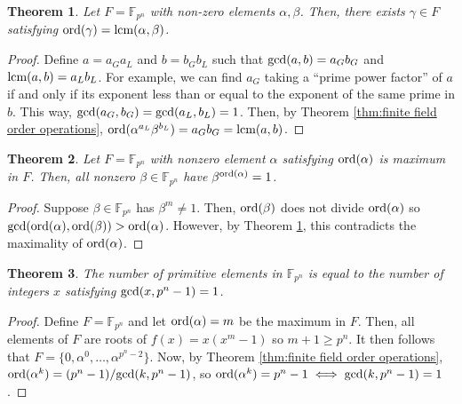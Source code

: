 \documentclass[
    parskip=half,
    toc=flat,
    toc=sectionentrydotfill,
]{scrartcl}  %
\theoremstyle{definition}
\theoremstyle{plain}
\newtheorem{theorem}{Theorem}[definition]
\theoremstyle{remark}
\newcommand{\F}{\mathbb{F}_{p^n}}
\renewcommand{\gcd}[1]{\textup{gcd}(#1)}
\newcommand{\lcm}[1]{\textup{lcm}(#1)}
\newcommand{\ord}[1]{\textup{ord}(#1)}
\begin{document}
\begin{theorem}
    \label{thm:exists element for every order lcm}
    Let $F=\F$ with non-zero elements $\alpha,\beta$.
    Then, there exists $\gamma\in F$ satisfying $\ord\gamma=\lcm{\alpha,\beta}$.
\end{theorem}

\begin{proof}
    Define $a=a_Ga_L$ and $b=b_Gb_L$ such that $\gcd{a,b}=a_Gb_G$ and $\lcm{a,b}=a_Lb_L$.
    For example, we can find $a_G$ taking a ``prime power factor'' of $a$ if and only if its exponent less than or
    equal to the exponent of the same prime in $b$.
    This way, $\gcd{a_G,b_G}=\gcd{a_L,b_L}=1$.
    Then, by Theorem \ref{thm:finite field order operations}, $\ord{\alpha^{a_L}\beta^{b_L}}=a_Gb_G=\lcm{a,b}$.
\end{proof}

\begin{theorem}
    Let $F=\F$ with nonzero element $\alpha$ satisfying $\ord{\alpha}$ is maximum in $F$.
    Then, all nonzero $\beta\in\F$ have $\beta^{\ord\alpha}=1$.
\end{theorem}

\begin{proof}
    Suppose $\beta\in\F$ has $\beta^m\neq 1$.
    Then, $\ord\beta$ does not divide $\ord\alpha$ so $\gcd{\ord\alpha,\ord\beta}>\ord\alpha$.
    However, by Theorem \ref{thm:exists element for every order lcm}, this contradicts the maximality of $\ord\alpha$.
\end{proof}

\begin{theorem}
    The number of primitive elements in $\F$ is equal to the number of integers $x$ satisfying $\gcd{x,p^n-1}=1$.
\end{theorem}

\begin{proof}
    Define $F=\F$ and let $\ord\alpha=m$ be the maximum in $F$.
    Then, all elements of $F$ are roots of $f(x)=x(x^m-1)$ so $m+1\geq p^n$.
    It then follows that $F=\{0,\alpha^0,\dots,\alpha^{p^n-2}\}$.
    Now, by Theorem \ref{thm:finite field order operations}, $\ord{\alpha^k}=(p^n-1)/\gcd{k,p^n-1}$, so
    $\ord{\alpha^k}=p^n-1\iff\gcd{k,p^n-1}=1$.
\end{proof}
\end{document}
